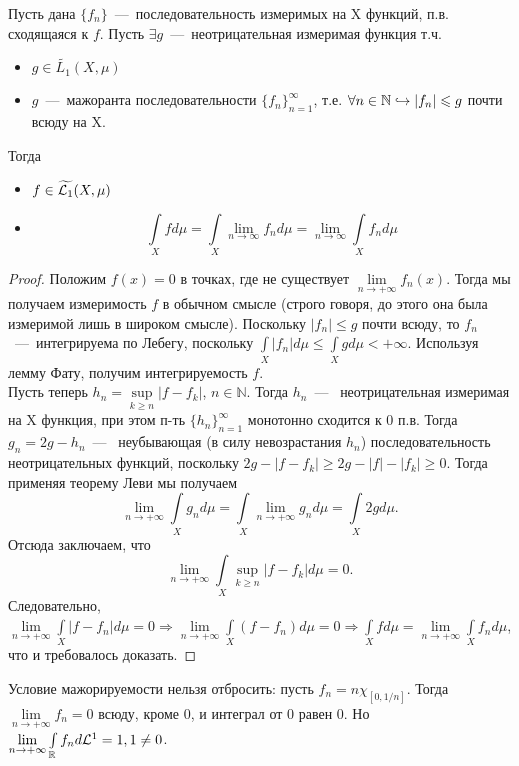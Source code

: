 \begin{theorem}
    Пусть дана $\{f_n\}$~---~последовательность измеримых  на X функций, п.в. сходящаяся к $f$. Пусть $\exists g$~---~неотрицательная измеримая функция т.ч. 
    \begin{itemize}
        \item $g \in \widetilde{L_1}(X, \mu)$
        \item $g$~---~мажоранта последовательности $\{f_n\}_{n=1}^{\infty}$, т.е. $\forall n \in \mathbb{N} \hookrightarrow |f_n| \leqslant g$ почти всюду на X.
    \end{itemize}
    Тогда 
    \begin{itemize}
        \item $f \in \widetilde{\mathcal{L}_1}(X, \mu)$
        \item \[
    \int\limits_X f d \mu = \int\limits_X \lim\limits_{n \to \infty} f_n d \mu = \lim\limits_{n \to \infty} \int\limits_X f_n d \mu
    \]
    \end{itemize}

\end{theorem}
\begin{proof}
    Положим $f(x) = 0$ в точках, где не существует $\lim\limits_{n \rightarrow +\infty} f_n(x)$. Тогда мы получаем измеримость $f$ в обычном смысле (строго говоря, до этого она была измеримой лишь в широком смысле). Поскольку $|f_n| \leq g$ почти всюду, то $f_n$~---~интегрируема по Лебегу, поскольку $\int\limits_X |f_n|d\mu \leq \int\limits_X gd\mu < +\infty$. Используя лемму Фату, получим интегрируемость $f$. \\
    Пусть теперь $h_n = \sup\limits_{k \geq n} |f - f_k|$, $n \in \mathbb{N}$. Тогда $h_n$~---~ неотрицательная измеримая на X функция, при этом п-ть ${\{h_n\}}_{n=1}^{\infty}$ монотонно сходится к 0 п.в. Тогда $g_n = 2g - h_n$~---~ неубывающая (в силу невозрастания $h_n$) последовательность неотрицательных функций, поскольку $2g - |f - f_k| \geq 2g - |f| - |f_k| \geq 0$. Тогда применяя теорему Леви мы получаем \[\lim\limits_{n \rightarrow +\infty} \int\limits_X g_nd\mu = \int\limits_X \lim\limits_{n \rightarrow +\infty} g_nd\mu = \int\limits_X 2gd\mu.\]
    Отсюда заключаем, что \[\lim\limits_{n \rightarrow +\infty} \int\limits_X \sup\limits_{k \geq n} |f - f_k|d\mu = 0.\]
    Следовательно, $\lim\limits_{n \rightarrow +\infty} \int\limits_X |f - f_n|d\mu = 0 \Rightarrow \lim\limits_{n \rightarrow +\infty} \int\limits_X (f - f_n)d\mu = 0 \Rightarrow \int\limits_X fd\mu = \lim\limits_{n\rightarrow +\infty} \int\limits_X f_nd\mu$, что и требовалось доказать.
\end{proof}

\begin{note}
    Условие мажорируемости нельзя отбросить: пусть $f_n = n\chi_{[0, 1/n]}$. Тогда $\lim\limits_{n \rightarrow +\infty} f_n = 0$ всюду, кроме 0, и интеграл от 0 равен 0. Но $\lim\limits_{n \rightarrow +\infty} \int\limits_{\mathbb{R}} f_nd\mathcal{L}^1 = 1, 1 \neq 0$.
\end{note}